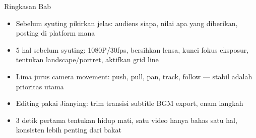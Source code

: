 \begin{tcbsummary}{Ringkasan Bab}
\begin{itemize}
  \item Sebelum syuting pikirkan jelas: audiens siapa, nilai apa yang diberikan, posting di platform mana
  \item 5 hal sebelum syuting: 1080P/30fps, bersihkan lensa, kunci fokus eksposur, tentukan landscape/portret, aktifkan grid line
  \item Lima jurus camera movement: push, pull, pan, track, follow — stabil adalah prioritas utama
  \item Editing pakai Jianying: trim transisi subtitle BGM export, enam langkah
  \item 3 detik pertama tentukan hidup mati, satu video hanya bahas satu hal, konsisten lebih penting dari bakat
\end{itemize}

\end{tcbsummary}
